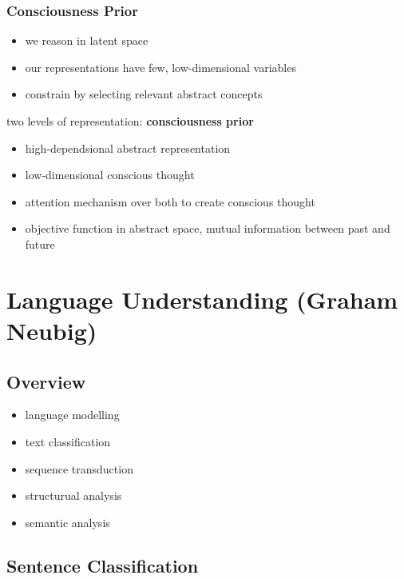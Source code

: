 \documentclass[]{article}
\theoremstyle{definition}
\begin{document}
    \subsubsection{Consciousness Prior}%
    \label{ssub:consciousness_prior}

    \begin{itemize}
        \item we reason in latent space
        \item our representations have few, low-dimensional variables
        \item constrain by selecting relevant abstract concepts
    \end{itemize}

    two levels of representation: \textbf{consciousness prior}
    \begin{itemize}
        \item high-dependsional abstract representation
        \item low-dimensional conscious thought
        \item attention mechanism over both to create conscious thought
        \item objective function in abstract space, mutual information between past and future
    \end{itemize}

    \section{Language Understanding {\small(Graham Neubig)}}%
    \label{sec:language_understanding_small_graham_neubig_}

    \subsection{Overview}%
    \label{sub:overview}

    \begin{itemize}
        \item language modelling
        \item text classification
        \item sequence transduction
        \item structurual analysis
        \item semantic analysis
    \end{itemize}

    \subsection{Sentence Classification}%
    \label{sub:sentence_classification}
\end{document}
